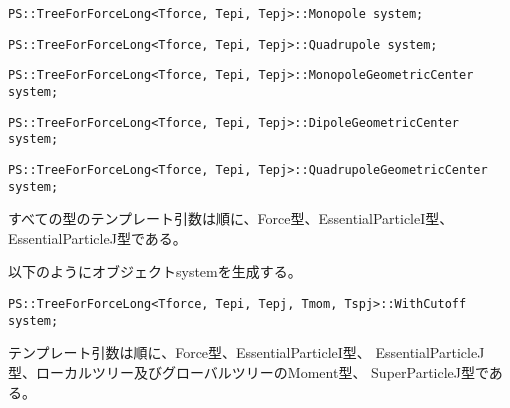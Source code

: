 \begin{screen}
\begin{verbatim}
PS::TreeForForceLong<Tforce, Tepi, Tepj>::Monopole system;
\end{verbatim}
\end{screen}


\begin{screen}
\begin{verbatim}
PS::TreeForForceLong<Tforce, Tepi, Tepj>::Quadrupole system;
\end{verbatim}
\end{screen}

\begin{screen}
\begin{verbatim}
PS::TreeForForceLong<Tforce, Tepi, Tepj>::MonopoleGeometricCenter system;
\end{verbatim}
\end{screen}
\begin{screen}
\begin{verbatim}
PS::TreeForForceLong<Tforce, Tepi, Tepj>::DipoleGeometricCenter system;
\end{verbatim}
\end{screen}

\begin{screen}
\begin{verbatim}
PS::TreeForForceLong<Tforce, Tepi, Tepj>::QuadrupoleGeometricCenter system;
\end{verbatim}
\end{screen}
すべての型のテンプレート引数は順に、Force型、EssentialParticleI型、
EssentialParticleJ型である。



以下のようにオブジェクトsystemを生成する。
\begin{screen}
\begin{verbatim}
PS::TreeForForceLong<Tforce, Tepi, Tepj, Tmom, Tspj>::WithCutoff system;
\end{verbatim}
\end{screen}
テンプレート引数は順に、Force型、EssentialParticleI型、
EssentialParticleJ型、ローカルツリー及びグローバルツリーのMoment型、
SuperParticleJ型である。

